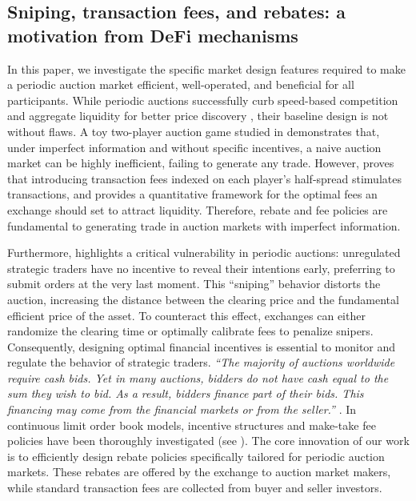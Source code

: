 \documentclass[12pt]{article}
\begin{document}
\subsection{Sniping, transaction fees, and rebates: a motivation from DeFi mechanisms}

In this paper, we investigate the specific market design features required to make a periodic auction market efficient, well-operated, and beneficial for all participants. While periodic auctions successfully curb speed-based competition and aggregate liquidity for better price discovery \cite{paul2021optimal}, their baseline design is not without flaws. A toy two-player auction game studied in \cite{derchu2023equilibria} demonstrates that, under imperfect information and without specific incentives, a naive auction market can be highly inefficient, failing to generate any trade. However, \cite{derchu2023equilibria} proves that introducing transaction fees indexed on each player's half-spread stimulates transactions, and provides a quantitative framework for the optimal fees an exchange should set to attract liquidity. Therefore, rebate and fee policies are fundamental to generating trade in auction markets with imperfect information. 

Furthermore, \cite{mastrolia2024clearing} highlights a critical vulnerability in periodic auctions: unregulated strategic traders have no incentive to reveal their intentions early, preferring to submit orders at the very last moment. This ``sniping'' behavior distorts the auction, increasing the distance between the clearing price and the fundamental efficient price of the asset. To counteract this effect, exchanges can either randomize the clearing time or optimally calibrate fees to penalize snipers. Consequently, designing optimal financial incentives is essential to monitor and regulate the behavior of strategic traders. \textit{``The majority of auctions worldwide require cash bids. Yet in many auctions, bidders do not have cash equal to the sum they wish to bid. As a result, bidders finance part of their bids. This financing may come from the financial markets or from the seller.''} \cite{rhodes2005financing}. 
In continuous limit order book models, incentive structures and make-take fee policies have been thoroughly investigated (see \cite{euch2021optimal}). The core innovation of our work is to efficiently design rebate policies specifically tailored for periodic auction markets. These rebates are offered by the exchange to auction market makers, while standard transaction fees are collected from buyer and seller investors.\\
\end{document}
